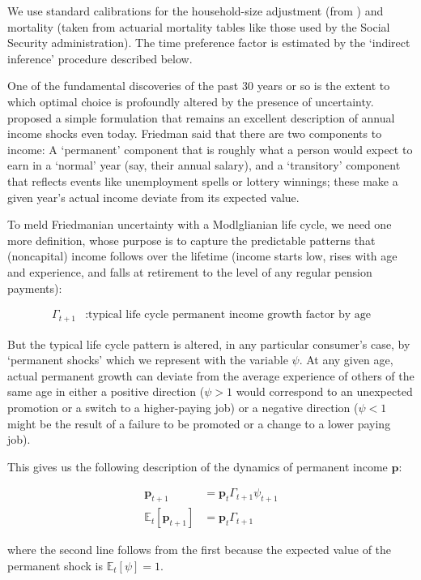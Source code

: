 \documentclass{article}
\newcommand{\pLvl}{\mathbf{p}}
\newcommand{\Ex}{\mathbb{E}}
\newcommand{\permGroFac}{\Gamma}
\newcommand{\permShk}{\psi}
\begin{document}
We use standard calibrations for the household-size adjustment (from \cite{Cagetti_2003}) and mortality (taken from actuarial mortality tables like those used by the Social Security administration). The time preference factor is estimated by the `indirect inference' procedure described below.

One of the fundamental discoveries of the past 30 years or so is the extent to which optimal choice is profoundly altered by the presence of uncertainty. \cite{Friedman1957b} proposed a simple formulation that remains an excellent description of annual income shocks even today. Friedman said that there are two components to income: A `permanent' component that is roughly what a person would expect to earn in a `normal' year (say, their annual salary), and a `transitory' component that reflects events like unemployment spells or lottery winnings; these make a given year's actual income deviate from its expected value.

To meld Friedmanian uncertainty with a Modlglianian life cycle, we need one more definition, whose purpose is to capture the predictable patterns that (noncapital) income follows over the lifetime (income starts low, rises with age and experience, and falls at retirement to the level of any regular pension payments):

\begin{align}
    \permGroFac_{t+1} & : \text{typical life cycle permanent income growth factor by age}
\end{align}

But the typical life cycle pattern is altered, in any particular consumer's case, by `permanent shocks' which we represent with the variable $\permShk$. At any given age, actual permanent growth can deviate from the average experience of others of the same age in either a positive direction ($\psi>1$ would correspond to an unexpected promotion or a switch to a higher-paying job) or a negative direction ($\psi < 1$ might be the result of a failure to be promoted or a change to a lower paying job).

This gives us the following description of the dynamics of permanent income $\pLvl$:

\begin{align}
    \pLvl_{t+1} & = \pLvl_{t} \permGroFac_{t+1} \permShk_{t+1}
    \\ \Ex_{t}[\pLvl_{t+1}] & = \pLvl_{t} \permGroFac_{t+1}
\end{align}

where the second line follows from the first because the expected value of the permanent shock is $\Ex_{t}[\permShk]=1$.
\end{document}
